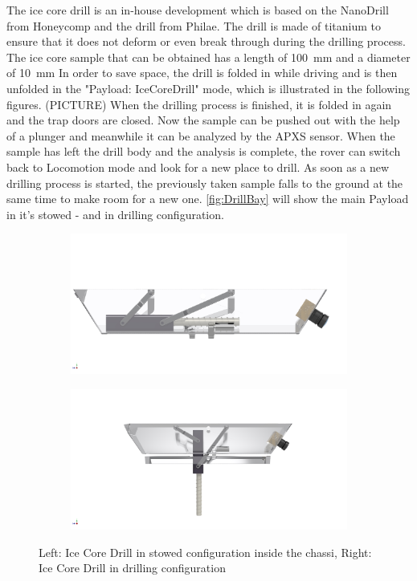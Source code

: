 The ice core drill is an in-house development which is based on the NanoDrill from Honeycomp and the drill from Philae. The drill is made of titanium to ensure that it does not deform or even break through during the drilling process.
The ice core sample that can be obtained has a length of 100~mm and a diameter of 10~mm
In order to save space, the drill is folded in while driving and is then unfolded in the "Payload: IceCoreDrill" mode, which is illustrated in the following figures. (PICTURE)
When the drilling process is finished, it is folded in again and the trap doors are closed.
Now the sample can be pushed out with the help of a plunger and meanwhile it can be analyzed by the APXS sensor. 
When the sample has left the drill body and the analysis is complete, the rover can switch back to Locomotion mode and look for a new place to drill. As soon as a new drilling process is started, the previously taken sample falls to the ground at the same time to make room for a new one.
\autoref{fig:DrillBay} will show the main Payload in it's stowed - and in drilling configuration.

\begin{figure}[htb]
     \centering
     \begin{subfigure}[b]{0.49\textwidth}
         \centering
         \includegraphics[width=\textwidth]{Media/DrillingBay1}
         \label{fig:stowedDrill}
     \end{subfigure}
     \hfill
     \begin{subfigure}[b]{0.49\textwidth}
         \centering
         \includegraphics[width=\textwidth]{Media/DrillingBay_unfolded1}
         \label{fig:drillconfig}
     \end{subfigure}
     \hfill
     \caption{Left: Ice Core Drill in stowed configuration inside the chassi, Right: Ice Core Drill in drilling configuration}
     \label{fig:DrillBay}
\end{figure}

